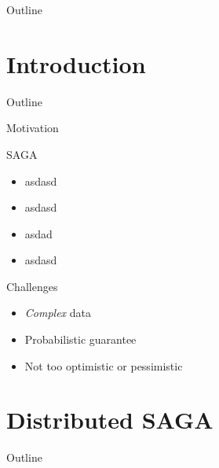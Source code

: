 \newcommand{\PP}{\mathbb{P}}
\newcommand{\EE}{\mathbb{E}}
\newcommand{\One}{\mathds{1}}
\makeatletter
\newcommand*{\rom}[1]{\expandafter\@slowromancap\romannumeral #1@}
\makeatother

\begin{frame}{Outline}
	\tableofcontents[hideallsubsections]
\end{frame}

\section{Introduction}

\begin{frame}{Outline}
\end{frame}
\begin{frame}{Motivation}
	\begin{block}{SAGA}
		\begin{itemize}
			\item asdasd
			\item asdasd
			\item asdad
			\item asdasd
		\end{itemize}
	\end{block}
	\pause
	\begin{block}{Challenges}
		\begin{itemize}
			\item \emph{Complex} data
			\item Probabilistic guarantee
			\item Not too optimistic or pessimistic
		\end{itemize}
	\end{block}
\end{frame}

\section{Distributed SAGA}

\begin{frame}{Outline}
\end{frame}

